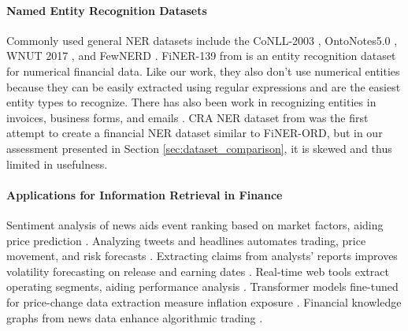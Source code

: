 \documentclass[11pt]{article}
\begin{document}

\paragraph{Named Entity Recognition Datasets} 
Commonly used general NER datasets include the CoNLL-2003 \citep{sang2003introduction}, OntoNotes5.0 \citep{AB2-MKJJ2R-2013}, WNUT 2017 \citep{derczynski-etal-2017-results}, and FewNERD \citep{ding-etal-2021-nerd}. FiNER-139 from \citet{loukas-etal-2022-finer} is an entity recognition dataset for numerical financial data. Like our work, they also don't use numerical entities because they can be easily extracted using regular expressions and are the easiest entity types to recognize. There has also been work in recognizing entities in invoices, business forms, and emails \citep{info10080248}. CRA NER dataset from \citet{alvarado2015domain} was the first attempt to create a financial NER dataset similar to FiNER-ORD, but in our assessment presented in Section \ref{sec:dataset_comparison}, it is skewed and thus limited in usefulness.

\paragraph{Applications for Information Retrieval in Finance} 
Sentiment analysis of news aids event ranking based on market factors, aiding price prediction \citep{feng2021fineventranking}. Analyzing tweets and headlines automates trading, price movement, and risk forecasts \citep{sawhney2021hyperbolic}. Extracting claims from analysts' reports improves volatility forecasting on release and earning dates \cite{shah2024numerical}. Real-time web tools extract operating segments, aiding performance analysis \citep{ma2020opsegspot}. Transformer models fine-tuned for price-change data extraction measure inflation exposure \cite{chava2022measuring}. Financial knowledge graphs from news data enhance algorithmic trading \citep{cheng2020finkgtrading}.
\end{document}
